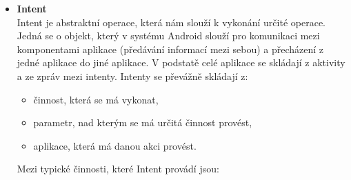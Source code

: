 \documentclass{vskpou} %
\begin{document}
\begin{itemize}
    \newpage
    \item \textbf{Intent}\\
    Intent je abstraktní operace, která nám slouží k vykonání určité operace. Jedná se o objekt, který v systému Android slouží pro komunikaci mezi komponentami aplikace (předávání informací mezi sebou) a přecházení z jedné aplikace do jiné aplikace. V podstatě celé aplikace se skládají z aktivity a ze zpráv mezi intenty. Intenty se převážně skládají z:
     \begin{itemize}
        \item činnost, která se má vykonat,
        \item parametr, nad kterým se má určitá činnost provést,
        \item aplikace, která má danou akci provést.
        \end{itemize}
       
     Mezi typické činnosti, které Intent provádí jsou:
    

\end{itemize}
\end{document}
